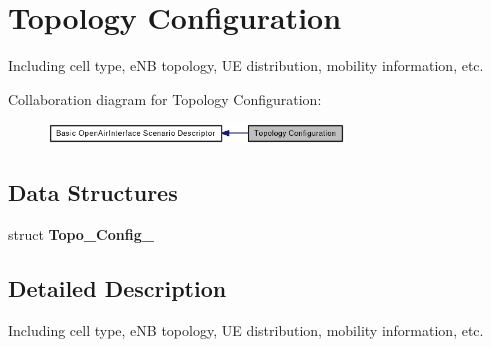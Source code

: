 \section{Topology Configuration}
\label{group____topo__config}
Including cell type, eNB topology, UE distribution, mobility information, etc.  




Collaboration diagram for Topology Configuration:\nopagebreak
\begin{figure}[H]
\begin{center}
\leavevmode
\includegraphics[width=223pt]{group____topo__config}
\end{center}
\end{figure}
\subsection*{Data Structures}
\begin{CompactItemize}
\item 
struct {\bf Topo\_\-Config\_\-}
\end{CompactItemize}


\subsection{Detailed Description}
Including cell type, eNB topology, UE distribution, mobility information, etc. 